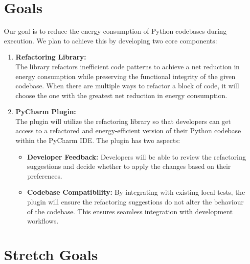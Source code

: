 \documentclass{article}
\begin{document}

\section{Goals}

Our goal is to reduce the energy consumption of Python codebases during execution. We plan to achieve this by developing two core components:

\begin{enumerate}
    \item \textbf{Refactoring Library:} \\
    The library refactors inefficient code patterns to achieve a net reduction in energy consumption while preserving the functional integrity of the given codebase. When there are multiple ways to refactor a block of code, it will choose the one with the greatest net reduction in energy consumption.

    \item \textbf{PyCharm Plugin:} \\
    The plugin will utilize the refactoring library so that developers can get access to a refactored and energy-efficient version of their Python codebase within the PyCharm IDE. The plugin has two aspects:

    \begin{itemize}
        \item \textbf{Developer Feedback:} Developers will be able to review the refactoring suggestions and decide whether to apply the changes based on their preferences.
        \item \textbf{Codebase Compatibility:} By integrating with existing local tests, the plugin will ensure the refactoring suggestions do not alter the behaviour of the codebase. This ensures seamless integration with development workflows.
    \end{itemize}
\end{enumerate}

\section{Stretch Goals}
\end{document}
